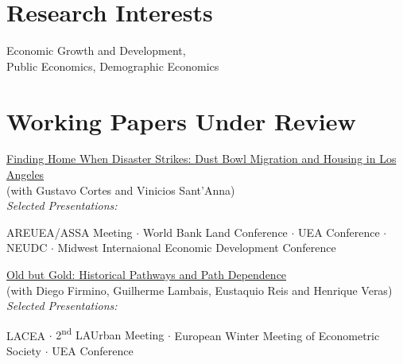 \documentclass[mm, 10pt]{simple_style}
\begin{document}
\begin{resume}
\section{Research Interests}

Economic Growth and Development,   \\
Public Economics, Demographic Economics

\section{Working Papers Under Review}

\href{https://www.usf.edu/arts-sciences/departments/economics/documents/wpaper/2024-05.pdf}{Finding Home When Disaster Strikes: Dust Bowl Migration and Housing in Los Angeles} \\
(with Gustavo Cortes and Vinicios Sant'Anna) \\
\textit{Selected Presentations:} 
\begin{minipage}[t]{0.7\textwidth}
AREUEA/ASSA Meeting
$\cdot$ {World Bank Land Conference}
$\cdot$ {UEA Conference}
$\cdot$ {NEUDC}
$\cdot$ {Midwest Internaional Economic Development Conference}
\end{minipage}

\href{https://papers.ssrn.com/sol3/papers.cfm?abstract_id=4513384}{Old but Gold: Historical Pathways and Path Dependence} \\
(with Diego Firmino, Guilherme Lambais, Eustaquio Reis and Henrique Veras) \\
\textit{Selected Presentations:} 
\begin{minipage}[t]{0.7\textwidth}
{LACEA}
$\cdot$ {2\textsuperscript{nd} LAUrban Meeting}
$\cdot$ {European Winter Meeting of Econometric Society}
$\cdot$ {UEA Conference}

\end{minipage}




\end{resume}
\end{document}
